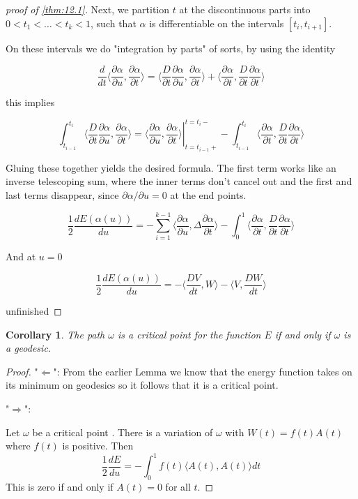 \documentclass{article}
\newtheorem{proof}{Proof}
\newtheorem{cor}{Corollary}
\newcommand{\angle}[1]{\langle #1 \rangle}
\newcommand{\ome}{ $\omega$ }
\begin{document}
\begin{proof}[proof of \ref{thm:12.1}]
    Next, we partition $t$ at the discontinuous parts into $0 \lt t_1 \lt \ldots \lt t_k \lt 1$,
    such that $\alpha$ is differentiable on the intervals $[t_i, t_{i+1}]$.

    On these intervals we do "integration by parts" of sorts, by using the identity

    \[
        \frac{d}{dt} \angle{\frac{\partial \alpha}{\partial u}, \frac{\partial \alpha}{\partial t}} =
        \angle{\frac{D}{\partial t} \frac{\partial \alpha}{\partial u}, \frac{\partial \alpha}{\partial t}}
        +
        \angle{\frac{\partial \alpha}{\partial t}, \frac{D}{\partial t} \frac{\partial \alpha}{\partial t}}
    \]

    this implies

    \[
        \int_{t_{i-1}}^{t_i} \angle{\frac{D}{\partial t} \frac{\partial \alpha}{\partial u}, \frac{\partial \alpha}{\partial t}}
        =
        \left.  \angle{\frac{\partial \alpha}{\partial u}, \frac{\partial \alpha}{\partial t}} \right\vert_{t=t_{i-1} +}^{t=t_i -}
        -
        \int_{t_{i-1}}^{t_i} \angle{\frac{\partial \alpha}{\partial t}, \frac{D}{\partial t} \frac{\partial \alpha}{\partial t}}
    \]

    Gluing these together yields the desired formula. The first term works like
    an inverse telescoping sum, where the inner terms don't cancel out and the
    first and last terms disappear, since $\partial \alpha / \partial u = 0$ at
    the end points.

    \[
        \frac{1}{2} \frac{dE(\alpha(u))}{du}
        =
        - \sum_{i=1}^{k-1} \angle{\frac{\partial \alpha}{\partial u}, \Delta \frac{\partial \alpha}{\partial t}}
        -
        \int_{0}^{1} \angle{\frac{\partial \alpha}{\partial t}, \frac{D}{\partial t} \frac{\partial \alpha}{\partial t}}
    \]

    And at $u = 0$

    \[
        \frac{1}{2} \frac{dE(\alpha(u))}{du}
        =
        - \langle \frac{DV}{dt}, W \rangle - \langle V, \frac{DW}{dt} \rangle
    \]

    unfinished
\end{proof}

\begin{cor}
    The path $\omega$ is a critical point for the function $E$ if and only if $\omega$ is a geodesic.
\end{cor}

\begin{proof}

    "$\Leftarrow$": From the earlier Lemma we know that the energy function takes on its minimum on geodesics so it follows that it is a critical point.

    "$\Rightarrow$":


    Let \ome be a critical point . There is a variation of \ome with $W(t) = f (t)A(t)$ where
    $f(t)$ is positive.
    Then
    \[
        \frac{1}{2}\frac{dE}{du} = - \int_0^1 f(t) \angle{A(t), A(t)} dt
    \]
    This is zero if and only if $A(t) = 0$ for all $t$.


\end{proof}
\end{document}
